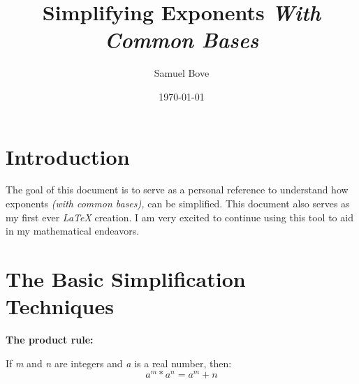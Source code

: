 \documentclass[12pt, letterpaper]{article}
\title{Simplifying Exponents \textit{With Common Bases}}
\author{Samuel Bove}
\date{\today}
\begin{document}
	
	
	\maketitle


	\section{Introduction}
	The goal of this document is to serve as a personal reference to understand how exponents \emph{(with common bases),} can be simplified. This document also serves as my first ever \emph{LaTeX} creation. I am very excited to continue using this tool to aid in my mathematical endeavors.
	
	\section{The Basic Simplification Techniques}
	
	\centering
	\textbf{The product rule:}
	
	If \textit{m} and \textit{n} are integers and \textit{a} is a real number, then:
	\begin{equation}
		a^m * a^n = a^m+n
	\end{equation}
	
	
	
	

	
	
	
	
	
\end{document}

